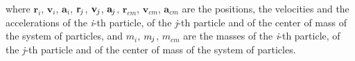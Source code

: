 \documentclass[10pt]{article}
\newcommand{\mM}{m}
\newcommand{\ri}{_i}
\newcommand{\rcm}{_{cm}}
\newcommand{\vR}{\mathbf{r}}
\newcommand{\vV}{\mathbf{v}}
\newcommand{\vA}{\mathbf{a}}
\newcommand{\rj}{_{\hspace{-0.081em}j}}
\begin{document}
\smallskip
\par \noindent where $\vR\ri$, $\vV\ri$, $\vA\ri$, $\vR\rj$, $\vV\rj$, $\vA\rj$, $\vR\rcm$, $\vV\rcm$, $\vA\rcm$ are the positions, the velocities and the accelerations of the \textit{i}-th particle, of the \textit{j}-th particle and of the center of mass of the system of particles, and $\mM\ri$, $\mM\rj$, $\mM\rcm$ are the masses of the \textit{i}-th particle, of the \textit{j}-th particle and of the center of mass of the system of particles.
\end{document}
